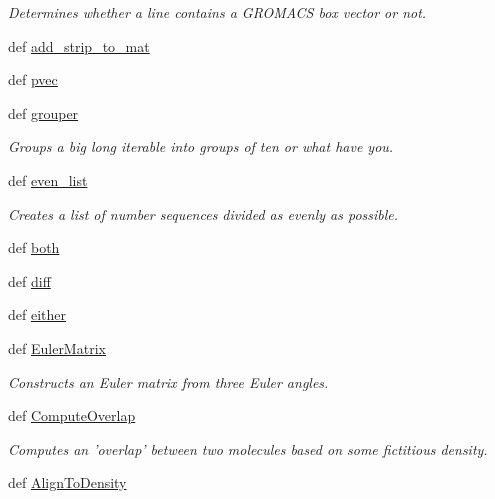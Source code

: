 \begin{DoxyCompactItemize}
\begin{DoxyCompactList}\small\item\em Determines whether a line contains a G\-R\-O\-M\-A\-C\-S box vector or not. \end{DoxyCompactList}\item 
def \hyperlink{namespaceforcebalance_1_1molecule_a4cdb2086978b281ed84cd66179c3f5b2}{add\-\_\-strip\-\_\-to\-\_\-mat}
\item 
def \hyperlink{namespaceforcebalance_1_1molecule_a58c3f09152db4d1c6e1db9df29c60c43}{pvec}
\item 
def \hyperlink{namespaceforcebalance_1_1molecule_a7fe52c2928c7b0329882541bef2e34cd}{grouper}
\begin{DoxyCompactList}\small\item\em Groups a big long iterable into groups of ten or what have you. \end{DoxyCompactList}\item 
def \hyperlink{namespaceforcebalance_1_1molecule_a5f529179461765fadbd0a742cdc2c677}{even\-\_\-list}
\begin{DoxyCompactList}\small\item\em Creates a list of number sequences divided as evenly as possible. \end{DoxyCompactList}\item 
def \hyperlink{namespaceforcebalance_1_1molecule_a5b50df23cc4d0e617fdc56538f0bea63}{both}
\item 
def \hyperlink{namespaceforcebalance_1_1molecule_a6f7c6217b1c64da309a8abd21dfdcf08}{diff}
\item 
def \hyperlink{namespaceforcebalance_1_1molecule_a75775be6563ad7f10695a9a45ff49ba9}{either}
\item 
def \hyperlink{namespaceforcebalance_1_1molecule_af02bf73765f34bbef81c4a5b000b86ce}{Euler\-Matrix}
\begin{DoxyCompactList}\small\item\em Constructs an Euler matrix from three Euler angles. \end{DoxyCompactList}\item 
def \hyperlink{namespaceforcebalance_1_1molecule_a8fcbb4a2b3470a85d25699b6f28a54fc}{Compute\-Overlap}
\begin{DoxyCompactList}\small\item\em Computes an 'overlap' between two molecules based on some fictitious density. \end{DoxyCompactList}\item 
def \hyperlink{namespaceforcebalance_1_1molecule_a9a58eb1746e51420f50da3f3a6d51485}{Align\-To\-Density}

\end{DoxyCompactItemize}
